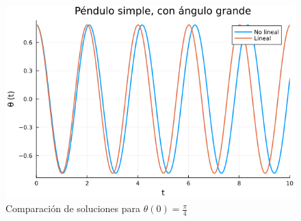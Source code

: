 \begin{ex}
    \begin{figure}[H]
        \centering
        \includegraphics[width=1.0\textwidth]{img/big.png}
        \caption{Comparación de soluciones para $\theta(0) = \frac{\pi}{4}$}
        \label{fig:pendulo_sol_big}
    \end{figure}


\end{ex}



